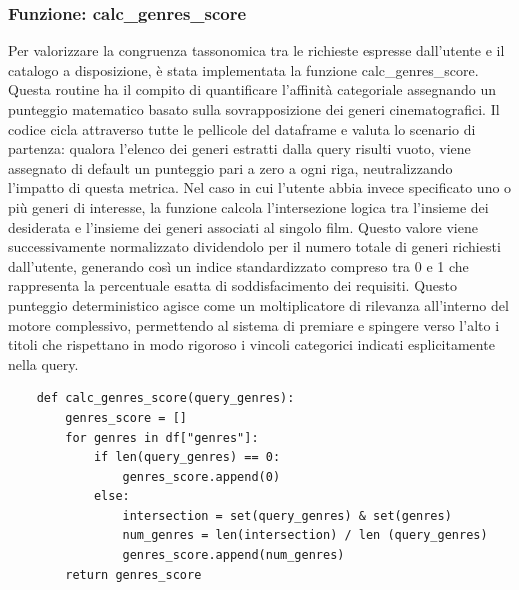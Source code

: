 \documentclass{article}
\begin{document}
\subsubsection{Funzione: calc\_genres\_score}
Per valorizzare la congruenza tassonomica tra le richieste espresse dall'utente e il catalogo a disposizione, \`e stata implementata la funzione calc\_genres\_score. Questa routine ha il compito di quantificare l'affinit\`a categoriale assegnando un punteggio matematico basato sulla sovrapposizione dei generi cinematografici. Il codice cicla attraverso tutte le pellicole del dataframe e valuta lo scenario di partenza: qualora l'elenco dei generi estratti dalla query risulti vuoto, viene assegnato di default un punteggio pari a zero a ogni riga, neutralizzando l'impatto di questa metrica. Nel caso in cui l'utente abbia invece specificato uno o pi\`u generi di interesse, la funzione calcola l'intersezione logica tra l'insieme dei desiderata e l'insieme dei generi associati al singolo film. Questo valore viene successivamente normalizzato dividendolo per il numero totale di generi richiesti dall'utente, generando cos\`i un indice standardizzato compreso tra 0 e 1 che rappresenta la percentuale esatta di soddisfacimento dei requisiti. Questo punteggio deterministico agisce come un moltiplicatore di rilevanza all'interno del motore complessivo, permettendo al sistema di premiare e spingere verso l'alto i titoli che rispettano in modo rigoroso i vincoli categorici indicati esplicitamente nella query.
\begin{lstlisting}
	def calc_genres_score(query_genres):
		genres_score = []
		for genres in df["genres"]:
			if len(query_genres) == 0:
				genres_score.append(0)
			else:
				intersection = set(query_genres) & set(genres)
				num_genres = len(intersection) / len (query_genres)
				genres_score.append(num_genres)
		return genres_score
\end{lstlisting}
\end{document}
